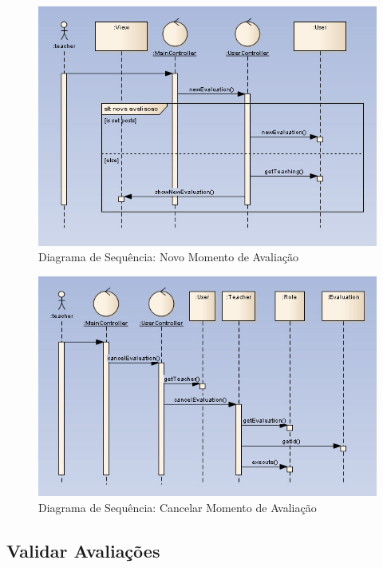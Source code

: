 \begin{figure}[!htbp]
\centering
\includegraphics{imagens/nova_avaliacao.jpg}
\caption{Diagrama de Sequência: Novo Momento de Avaliação}
\label{fig:nova_avaliacao}
\end{figure}

\begin{figure}[!htbp]
\centering
\includegraphics{imagens/cancelar_avaliacao.jpg}
\caption{Diagrama de Sequência: Cancelar Momento de Avaliação}
\label{fig:cancelar_avaliacao}
\end{figure}


\clearpage
\subsection{Validar Avaliações}

